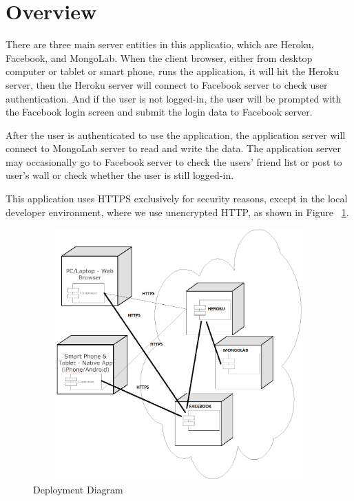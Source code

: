 
\section{Overview}
There are three main server entities in this applicatio, which are Heroku, Facebook, and MongoLab. When the client browser, either from desktop computer or tablet or smart phone, runs the application, it will hit the Heroku server, then the Heroku server will connect to Facebook server to check user authentication. And if the user is not logged-in, the user will be prompted with the Facebook login screen and submit the login data to Facebook server. 

After the user is authenticated to use the application, the application server will connect to MongoLab server to read and write the data. The application server may occasionally go to Facebook server to check the users' friend list or  post to user's wall or check whether the user is still logged-in. 

This application uses HTTPS exclusively for security reasons, except in the local developer environment, where we use unencrypted HTTP,  as shown in Figure ~\ref{fig:deployment}.

\vspace{3em}
\begin{figure}[H]
\begin{center}
\includegraphics[height=3.8in,width=6.5in]{images/deployment.png}
\caption{Deployment Diagram}
\label{fig:deployment}
\end{center}
\end{figure}


